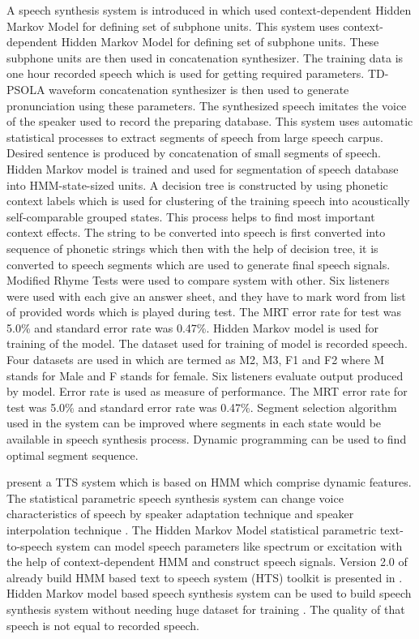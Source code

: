 A speech synthesis system is introduced in \cite{donovan1995improvements} which used context-dependent Hidden Markov Model
for defining set of subphone units. This system uses context-dependent Hidden Markov Model for defining set of subphone units. These subphone units are then used in concatenation synthesizer. The training data is one hour recorded speech which is used for getting required parameters. TD-PSOLA waveform concatenation synthesizer is then used to generate pronunciation using these parameters. The synthesized speech imitates the voice of the speaker used to record the preparing database. This system uses automatic statistical processes to extract segments of speech from large speech carpus. Desired sentence is produced by concatenation of small
segments of speech. Hidden Markov model is trained and used for segmentation of speech database into HMM-state-sized
units. A decision tree is constructed by using phonetic context labels which is used for clustering of the training speech into
acoustically self-comparable grouped states. This process helps to find most important context effects. The string to be
converted into speech is first converted into sequence of phonetic strings which then with the help of decision tree, it is
converted to speech segments which are used to generate final speech signals. Modified Rhyme Tests \cite{house1965articulation} were used to compare system
with other. Six listeners were used with each give an answer sheet, and they have to mark word from list of provided words
which is played during test. The MRT error rate for test was 5.0\% and standard error rate was 0.47\%. Hidden Markov model is used for training of the model. The dataset used for training of model is recorded speech. Four datasets are used in which are termed as M2, M3, F1 and F2 where M stands for Male and F stands for female. Six listeners evaluate output produced by model. Error rate is used as measure of performance. 
The MRT error rate for test was 5.0\% and standard error rate was 0.47\%. Segment selection algorithm used in the system can be improved where segments in each state would be available in speech synthesis process. Dynamic programming can be used to find optimal segment sequence.

\cite{masuko1996speech} present a TTS system which is based on HMM which comprise dynamic features. The statistical parametric speech synthesis system can change voice characteristics of speech by speaker adaptation technique \cite{tamura1998speaker} and speaker interpolation technique \cite{yoshimura2001speaker}. The Hidden Markov Model statistical parametric text-to-speech system can model speech parameters like spectrum or excitation with the help of context-dependent HMM and construct speech signals. Version 2.0 of already build HMM based text to speech system (HTS) toolkit is presented in \cite{zen2007hmm}. Hidden Markov model based speech synthesis system can be used to build speech synthesis system without needing huge dataset for training \cite{huang2001spoken}. The quality of that speech is not equal to recorded speech. 

